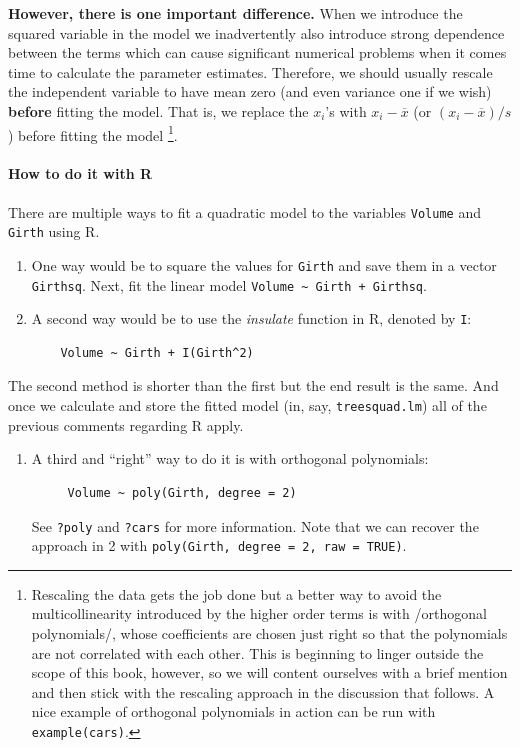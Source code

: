 \documentclass[captions=tableheading]{scrbook}
\begin{document}
\textbf{However, there is one important difference.} When we introduce the squared variable in the model we inadvertently also introduce strong dependence between the terms which can cause significant numerical problems when it comes time to calculate the parameter estimates. Therefore, we should usually rescale the independent variable to have mean zero (and even variance one if we wish) \textbf{before} fitting the model. That is, we replace the $x_{i}$'s with $x_{i}-\overline{x}$ (or $(x_{i}-\overline{x})/s$) before fitting the model
\footnote{Rescaling the data gets the job done but a better way to avoid the multicollinearity introduced by the higher order terms is with /orthogonal polynomials/, whose coefficients are chosen just right so that the polynomials are not correlated with each other. This is beginning to linger outside the scope of this book, however, so we will content ourselves with a brief mention and then stick with the rescaling approach in the discussion that follows. A nice example of orthogonal polynomials in action can be run with \texttt{example(cars)}.}.

\paragraph*{How to do it with \textsf{R}}

There are multiple ways to fit a quadratic model to the variables \texttt{Volume} and \texttt{Girth} using \textsf{R}.
\begin{enumerate}
\item One way would be to square the values for \texttt{Girth} and save them in a vector \texttt{Girthsq}. Next, fit the linear model \texttt{Volume \textasciitilde{} Girth + Girthsq}.
\item A second way would be to use the \emph{insulate} function in \textsf{R}, denoted by \texttt{I}:
\begin{verbatim}
    Volume ~ Girth + I(Girth^2)
\end{verbatim}
\end{enumerate}
The second method is shorter than the first but the end result is the same. And once we calculate and store the fitted model (in, say, \texttt{treesquad.lm}) all of the previous comments regarding \textsf{R} apply.  
\begin{enumerate}
\item A third and ``right'' way to do it is with orthogonal polynomials:
\begin{verbatim}
     Volume ~ poly(Girth, degree = 2)
\end{verbatim}
   See \texttt{?poly} and \texttt{?cars} for more information. Note that we can recover the approach in 2 with \texttt{poly(Girth, degree = 2, raw = TRUE)}.
\end{enumerate}
\end{document}
